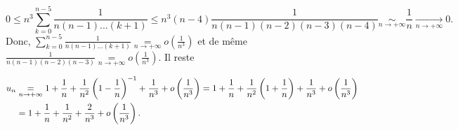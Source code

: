 \documentclass[11pt,a4paper]{article}
\begin{document}
$$0\leq n^3\sum_{k=0}^{n-5}\frac{1}{n(n-1)...(k+1)}\leq n^3(n-4)\frac{1}{n(n-1)(n-2)(n-3)(n-4)}\underset{n\rightarrow+\infty}{\sim}\frac{1}{n}\underset{n\rightarrow+\infty}{\rightarrow}0.$$
Donc, $\sum_{k=0}^{n-5}\frac{1}{n(n-1)...(k+1)}\underset{n\rightarrow+\infty}{=}o\left(\frac{1}{n^3}\right)$ et de même $\frac{1}{n(n-1)(n-2)(n-3)}\underset{n\rightarrow+\infty}{=} o\left(\frac{1}{n^3}\right)$. Il reste

\begin{align*}\ensuremath
u_n&\underset{n\rightarrow+\infty}{=}1+\frac{1}{n}+\frac{1}{n^2}\left(1-\frac{1}{n}\right)^{-1}+\frac{1}{n^3}+o\left(\frac{1}{n^3}\right)=1+\frac{1}{n}
+\frac{1}{n^2}\left(1+\frac{1}{n}\right)+\frac{1}{n^3}+o\left(\frac{1}{n^3}\right)\\
 &=1+\frac{1}{n}+\frac{1}{n^2}+\frac{2}{n^3}+o\left(\frac{1}{n^3}\right).
\end{align*}
\end{document}
